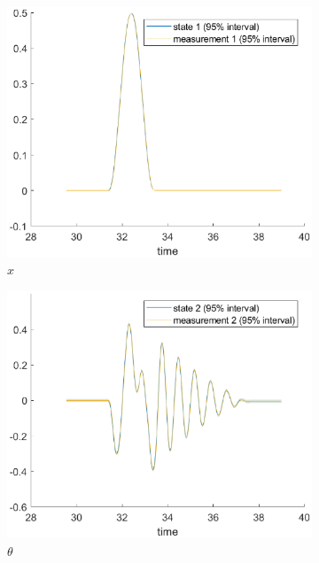 \documentclass[a4paper,kul]{kulakarticle} %
\begin{document}
\begin{figure}[htp!]
	\centering
	\begin{subfigure}[b]{0.48\textwidth}
		\centering
		\includegraphics[width=\textwidth]{state1.eps}
		\caption{$x$}
	\end{subfigure}
	\hfill
	\begin{subfigure}[b]{0.48\textwidth}  
		\centering 
		\includegraphics[width=\textwidth]{state2.eps}
		\caption{$\theta$}
	\end{subfigure}
	\begin{subfigure}[b]{0.48\textwidth}  

\end{subfigure}
\end{figure}
\end{document}
